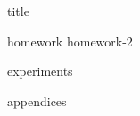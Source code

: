 \documentclass[11pt,titlepage]{report}
\begin{document}
{title}

\clearpage
\tableofcontents

\clearpage
{}
{homework}
{homework-2}

{experiments}

\clearpage
{}
\printbibliography[heading=bibintoc]

\clearpage
{}
{appendices}
\end{document}

